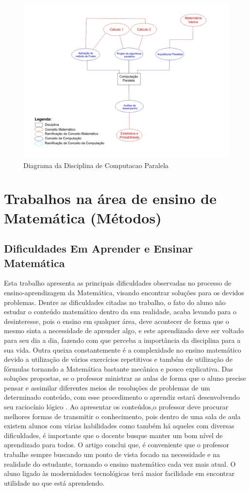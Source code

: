 \documentclass[12pt,a4paper]{article}
\begin{document}
\begin{figure}[!h]
	\centering
	\includegraphics[scale=0.5]{imagens/Diagrama Computacao Paralela.jpg} 
	\caption{Diagrama da Disciplina de Computacao Paralela}
\end{figure}

\section{Trabalhos na área de ensino de Matemática (Métodos)}

\subsection{Dificuldades Em Aprender e Ensinar Matemática}
Esta trabalho apresenta as principais dificuldades observadas no processo de ensino-aprendizagem da Matemática, visando encontrar soluções para os devidos problemas.
Dentre as dificuldades citadas no trabalho, o fato do aluno não estudar o conteúdo matemático dentro da sua realidade, acaba levando para o desinteresse, pois o ensino em qualquer área, deve acontecer de forma que o mesmo sinta a necessidade de aprender algo, e este aprendizado deve ser voltado para seu dia a dia, fazendo com que perceba a importância da disciplina para a sua vida. 
Outra queixa constantemente é a complexidade no ensino matemático devido a utilização de vários exercícios repetitivos e também de utilização de fórmulas tornando a Matemática bastante mecânica e pouco explicativa. 
Das soluções propostas, se o professor ministrar as aulas de forma que o aluno precise pensar e assimilar diferentes meios de resoluções de problemas de um determinado conteúdo, com esse procedimento o aprendiz estará desenvolvendo seu raciocínio lógico . Ao apresentar os conteúdos,o professor deve procurar melhores formas de transmitir o conhecimento, pois dentro de uma sala de aula existem alunos com várias habilidades como também há aqueles com diversas dificuldades, é importante que o docente busque manter um bom nível de aprendizado para todos.
O artigo conclui que, é conveniente que o professor trabalhe sempre buscando um ponto de vista focado na necessidade e na realidade do estudante, tornando o ensino matemático cada vez mais atual. O aluno ligado às modernidades tecnológicas terá maior facilidade em encontrar utilidade no que está aprendendo.
\end{document}
